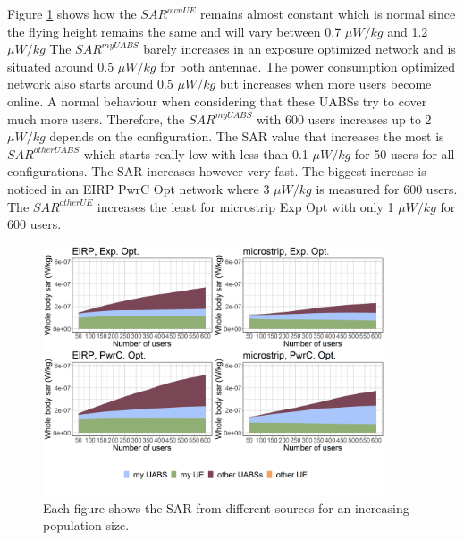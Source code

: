 Figure \ref{fig:s3b_fourSourcesMatrix} shows how the  $SAR^{ownUE}$  
remains almost constant which is normal since the flying height remains the same and will 
vary between  0.7 $\mu W/kg$ and 1.2 $\mu W/kg$
The $SAR^{myUABS}$ barely increases in an exposure optimized network and is situated around 0.5 $\mu W/kg$ for both antennae.
The power consumption optimized network also starts around 0.5 $\mu W/kg$ but increases when more users become online. 
A normal behaviour when considering that these \gls{UABS}s try to cover much more users. Therefore, the $SAR^{myUABS}$ 
with 600 users increases up to 2 $\mu W/kg$ depends on the configuration.
The \gls{SAR} value that increases the most is $SAR^{otherUABS}$ which 
starts really low with less than 0.1 $\mu W/kg$ for 50 users for all configurations. 
The \gls{SAR} increases however very fast. The biggest increase is noticed in an \gls{EIRP} \gls{PwrC Opt} network 
where 3 $\mu W/kg$ is measured for 600 users. The $SAR^{otherUE}$ increases the least for microstrip \gls{Exp Opt} with 
only 1 $\mu W/kg$ for 600 users.
\begin{figure}[h!]
\centering
  \includegraphics[width=0.9\textwidth]{../results/s3/uFourSources.png}
  \caption{Each figure shows the \acs{SAR} from different sources for an increasing population size. 
}
  \label{fig:s3b_fourSourcesMatrix}
\end{figure}

